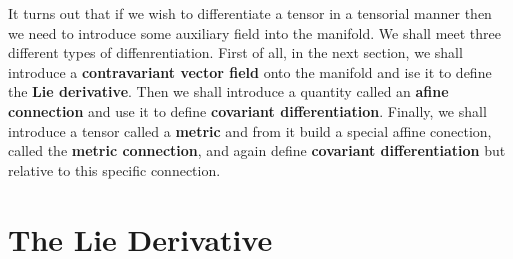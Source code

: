 It turns out that if  we wish to differentiate a tensor in a tensorial manner then we need to introduce some auxiliary field into the manifold. We shall meet three different types of diffenrentiation. First of all, in the next section, we shall introduce a \textbf{contravariant vector field} onto the manifold and ise it to define the \textbf{Lie derivative}. Then we shall introduce a quantity called an \textbf{afine connection} and use it to define \textbf{covariant differentiation}. Finally, we shall introduce a tensor called a \textbf{metric} and from it build a special affine conection, called the \textbf{metric connection}, and again define \textbf{covariant differentiation} but relative to this specific connection.

\section{The Lie Derivative}\label{sec:6.2}


